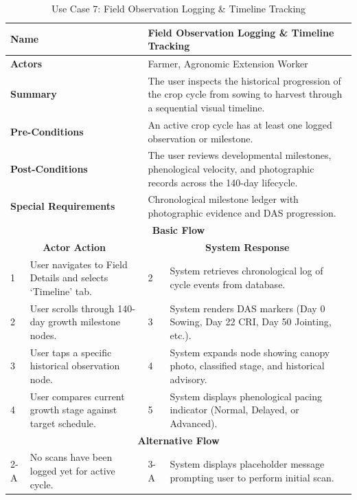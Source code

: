 \begin{table}[H]
\small
\centering
\caption{Use Case 7: Field Observation Logging \& Timeline Tracking}
\label{tab:uc7}
\begin{tabular}{|p{0.6cm}|p{6.4cm}|p{0.8cm}|p{6.6cm}|}
\hline
\multicolumn{2}{|p{7.0cm}|}{\textbf{Name}} & \multicolumn{2}{p{7.4cm}|}{Field Observation Logging \& Timeline Tracking} \\ \hline
\multicolumn{2}{|p{7.0cm}|}{\textbf{Actors}} & \multicolumn{2}{p{7.4cm}|}{Farmer, Agronomic Extension Worker} \\ \hline
\multicolumn{2}{|p{7.0cm}|}{\textbf{Summary}} & \multicolumn{2}{p{7.4cm}|}{The user inspects the historical progression of the crop cycle from sowing to harvest through a sequential visual timeline.} \\ \hline
\multicolumn{2}{|p{7.0cm}|}{\textbf{Pre-Conditions}} & \multicolumn{2}{p{7.4cm}|}{An active crop cycle has at least one logged observation or milestone.} \\ \hline
\multicolumn{2}{|p{7.0cm}|}{\textbf{Post-Conditions}} & \multicolumn{2}{p{7.4cm}|}{The user reviews developmental milestones, phenological velocity, and photographic records across the 140-day lifecycle.} \\ \hline
\multicolumn{2}{|p{7.0cm}|}{\textbf{Special Requirements}} & \multicolumn{2}{p{7.4cm}|}{Chronological milestone ledger with photographic evidence and DAS progression.} \\ \hline
\multicolumn{4}{|c|}{\textbf{Basic Flow}} \\ \hline
\multicolumn{2}{|c|}{\textbf{Actor Action}} & \multicolumn{2}{c|}{\textbf{System Response}} \\ \hline
1 & User navigates to Field Details and selects `Timeline' tab. & 2 & System retrieves chronological log of cycle events from database. \\ \hline
2 & User scrolls through 140-day growth milestone nodes. & 3 & System renders DAS markers (Day 0 Sowing, Day 22 CRI, Day 50 Jointing, etc.). \\ \hline
3 & User taps a specific historical observation node. & 4 & System expands node showing canopy photo, classified stage, and historical advisory. \\ \hline
4 & User compares current growth stage against target schedule. & 5 & System displays phenological pacing indicator (Normal, Delayed, or Advanced). \\ \hline
\multicolumn{4}{|c|}{\textbf{Alternative Flow}} \\ \hline
2-A & No scans have been logged yet for active cycle. & 3-A & System displays placeholder message prompting user to perform initial scan. \\ \hline
\end{tabular}
\end{table}

